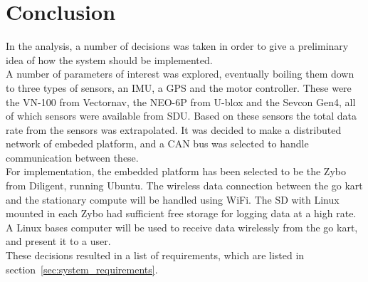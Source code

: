 





\section{Conclusion}
\label{sec:analysisconclusion}
In the analysis, a number of decisions was taken in order to give a preliminary idea of how the system should be implemented. \\

A number of parameters of interest was explored, eventually boiling them down to three types of sensors, an IMU, a GPS and the motor controller.
These were the VN-100 from Vectornav, the NEO-6P from U-blox and the Sevcon Gen4, all of which sensors were available from SDU.
Based on these sensors the total data rate from the sensors was extrapolated.
It was decided to make a distributed network of embeded platform, and a CAN bus was selected to handle communication between these.\\

For implementation, the embedded platform has been selected to be the Zybo from Diligent, running Ubuntu.
The wireless data connection between the go kart and the stationary compute will be handled using WiFi.
The SD with Linux mounted in each Zybo had sufficient free storage for logging data at a high rate.
A Linux bases computer will be used to receive data wirelessly from the go kart, and present it to a user. \\

These decisions resulted in a list of requirements, which are listed in section~\ref{sec:system_requirements}.

